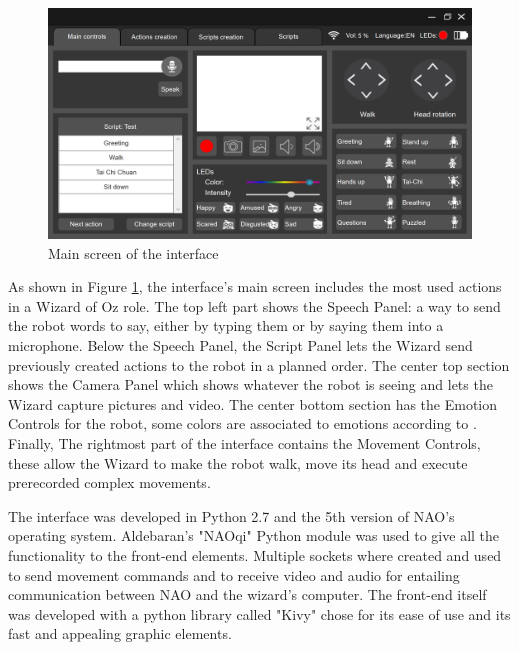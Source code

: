 \documentclass{article}
\begin{document}
        \begin{figure}[ht]
        \centering
        \includegraphics[width=\textwidth]{MainEN.png}
        \caption{Main screen of the interface\label{ref:pantalla1}}
    \end{figure}
    As shown in Figure \ref{ref:pantalla1}, the interface's main screen includes the most used actions in a Wizard of Oz role. The top left part shows the Speech Panel: a way to send the robot words to say, either by typing them or by saying them into a microphone. Below the Speech Panel, the Script Panel lets the Wizard send previously created actions to the robot in a planned order. The center top section shows the Camera Panel which shows whatever the robot is seeing and lets the Wizard capture pictures and video. The center bottom section has the Emotion Controls for the robot, some colors are associated to emotions according to  \cite{emotion}. 
    Finally, The rightmost part of the interface contains the Movement Controls, these allow the Wizard to make the robot walk, move its head and execute prerecorded complex movements.\par
    The interface was developed in Python 2.7 and the 5th version of NAO's operating system.
    Aldebaran's "NAOqi" Python module \cite{aldebaran} was used to give all the functionality to the front-end elements. Multiple sockets where created and used to send movement commands and to receive video and audio for entailing communication between NAO and the wizard's computer. The front-end itself was developed with a python library called "Kivy"\cite{kivy} chose for%
    its ease of use and its fast and appealing graphic elements.\par
{}

\end{document}
